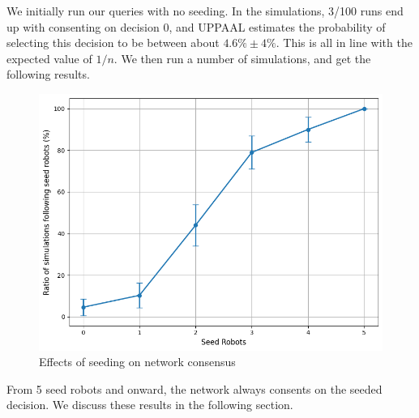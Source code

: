 We initially run our queries with no seeding. In the simulations, 3/100 runs end up with consenting on decision 0, and UPPAAL estimates the probability of selecting this decision to be between about $4.6\% \pm 4\%$. This is all in line with the expected value of $1/n$.  We then run a number of simulations, and get the following results.
\begin{figure}[H]
    \centering
    \includegraphics[width=0.9\linewidth]{pictures/SeedGraph.png}
    \caption{Effects of seeding on network consensus}
    \label{fig:D_relResults}
\end{figure}
From 5 seed robots and onward, the network always consents on the seeded decision.
\newline
We discuss these results in the following section.
